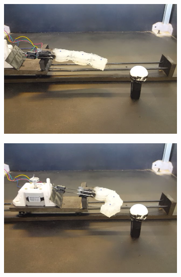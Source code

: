 \documentclass[letterpaper, 10 pt, conference]{ieeeconf}  %
\begin{document}
 \begin{figure}[htpb]
        \centering
        \begin{subfigure}[b]{0.72in} 
                \centering
                \includegraphics[width=\textwidth]{figures/finger/finger1.png}
        \end{subfigure}
        \begin{subfigure}[b]{0.72in}                            
                \centering
                \includegraphics[width=\textwidth]{figures/finger/finger2.png}
        \end{subfigure}
        \begin{subfigure}[b]{0.72in} 
                \centering

\end{subfigure}
\end{figure}
\end{document}
